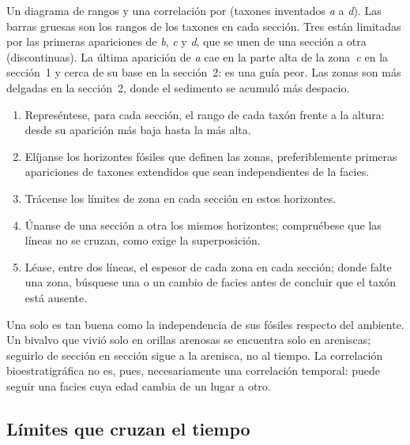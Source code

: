 \begin{omfigure}
{\small Un diagrama de rangos y una correlación por  (taxones inventados \emph{a} a \emph{d}). Las barras gruesas son los rangos de los taxones en cada sección. Tres  están limitadas por las primeras apariciones de \emph{b}, \emph{c} y \emph{d}, que se unen de una sección a otra (discontinuas). La última aparición de \emph{a} cae en la parte
alta de la zona~\emph{c} en la sección~1 y cerca de su base en la sección~2: es una guía peor. Las zonas son más delgadas en la sección~2, donde el sedimento se acumuló más despacio.}
\label{fig:b1:stratigraphic-scale:range-chart}
\end{omfigure}

\begin{method}\label{met:b1:stratigraphic-scale:biozones}
\begin{enumerate}
  \item Represéntese, para cada sección, el rango de cada taxón frente a la altura: desde su aparición más baja hasta la más alta.
  \item Elíjanse los horizontes fósiles que definen las zonas, preferiblemente primeras apariciones de taxones extendidos que sean independientes de la facies.
  \item Trácense los límites de zona en cada sección en estos horizontes.
  \item Únanse de una sección a otra los mismos horizontes; compruébese que las líneas no se cruzan, como exige la superposición.
  \item Léase, entre dos líneas, el espesor de cada zona en cada sección; donde falte una zona, búsquese una  o un cambio de facies antes de concluir que el taxón está ausente.
\end{enumerate}
\end{method}

Una  solo es tan buena como la independencia de sus fósiles respecto del ambiente. Un bivalvo que vivió solo en orillas arenosas se encuentra solo en areniscas; seguirlo de sección en sección sigue a la arenisca, no al tiempo. La correlación bioestratigráfica no es, pues, necesariamente una correlación temporal: puede seguir una facies cuya edad cambia de un lugar a otro.

\subsection*{Límites que cruzan el tiempo}


